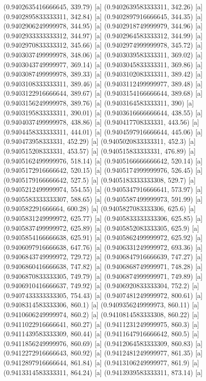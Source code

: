 {{{(0.9402635416666645, 339.79) [a] 
(0.9402639583333311, 342.26) [a] 
(0.9402895833333311, 342.84) [a] 
(0.9402897916666645, 344.35) [a] 
(0.9402906249999978, 344.95) [a] 
(0.9402918749999979, 344.96) [a] 
(0.9402933333333312, 344.97) [a] 
(0.9402964583333312, 344.99) [a] 
(0.9402970833333312, 345.66) [a] 
(0.9402974999999978, 345.72) [a] 
(0.9403037499999978, 348.06) [a] 
(0.9403039583333311, 369.02) [a] 
(0.9403043749999977, 369.14) [a] 
(0.9403045833333311, 369.86) [a] 
(0.9403087499999978, 389.33) [a] 
(0.9403102083333311, 389.42) [a] 
(0.9403108333333311, 389.46) [a] 
(0.9403112499999977, 389.48) [a] 
(0.9403122916666644, 389.67) [a] 
(0.9403154166666644, 389.68) [a] 
(0.9403156249999978, 389.76) [a] 
(0.9403164583333311, 390) [a] 
(0.9403195833333311, 390.01) [a] 
(0.9403616666666644, 438.55) [a] 
(0.9404037499999978, 438.86) [a] 
(0.940417708333331, 443.56) [a] 
(0.9404458333333311, 444.01) [a] 
(0.9404597916666644, 445.06) [a] 
(0.940473958333331, 452.29) [a] 
(0.9405020833333311, 452.3) [a] 
(0.940515208333331, 453.57) [a] 
(0.940515833333331, 476.89) [a] 
(0.9405162499999976, 518.14) [a] 
(0.9405166666666642, 520.14) [a] 
(0.9405172916666642, 520.15) [a] 
(0.9405174999999976, 526.45) [a] 
(0.9405179166666642, 527.5) [a] 
(0.9405183333333308, 529.7) [a] 
(0.9405212499999974, 554.55) [a] 
(0.9405347916666641, 573.97) [a] 
(0.9405583333333307, 588.65) [a] 
(0.9405587499999973, 591.99) [a] 
(0.940582291666664, 600.28) [a] 
(0.9405827083333306, 625.6) [a] 
(0.9405831249999972, 625.77) [a] 
(0.9405833333333306, 625.85) [a] 
(0.9405837499999972, 625.89) [a] 
(0.9405852083333305, 625.9) [a] 
(0.9405854166666638, 625.91) [a] 
(0.9405862499999972, 625.92) [a] 
(0.9406097916666638, 647.76) [a] 
(0.9406331249999972, 693.36) [a] 
(0.9406843749999972, 729.72) [a] 
(0.9406847916666639, 747.27) [a] 
(0.9406860416666638, 747.82) [a] 
(0.9406868749999971, 748.28) [a] 
(0.9406870833333305, 749.79) [a] 
(0.9406874999999971, 749.89) [a] 
(0.9406910416666637, 749.92) [a] 
(0.9406920833333304, 752.2) [a] 
(0.9407433333333305, 754.43) [a] 
(0.9407481249999972, 800.61) [a] 
(0.9408314583333306, 860.1) [a] 
(0.9409356249999973, 860.11) [a] 
(0.9410606249999974, 860.2) [a] 
(0.9410814583333308, 860.22) [a] 
(0.9411022916666641, 860.27) [a] 
(0.9411231249999975, 860.3) [a] 
(0.9411439583333309, 860.44) [a] 
(0.9411647916666642, 860.5) [a] 
(0.9411856249999976, 860.69) [a] 
(0.9412064583333309, 860.83) [a] 
(0.9412272916666643, 860.92) [a] 
(0.9412481249999977, 861.35) [a] 
(0.9412897916666644, 861.84) [a] 
(0.9413106249999977, 861.9) [a] 
(0.9413314583333311, 864.24) [a] 
(0.9413939583333311, 873.14) [a] 
}}}
